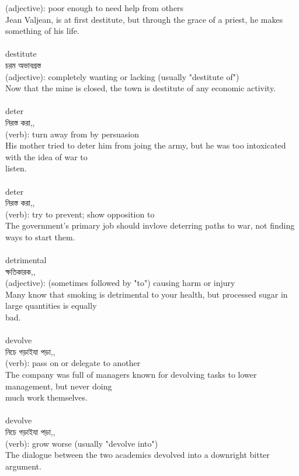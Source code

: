 \documentclass{article}
\begin{document}
{(adjective): poor enough to need help from others\\Jean Valjean, is at first destitute, but through the grace of a priest, he makes something of his life.\\}\\
{destitute}\\
{চরম অভাবগ্রস্ত}\\
{(adjective): completely wanting or lacking (usually "destitute of")\\Now that the mine is closed, the town is destitute of any economic activity.\\}\\
{deter}\\
{নিরস্ত করা,,}\\
{(verb): turn away from by persuasion\\His mother tried to deter him from joing the army, but he was too intoxicated with the idea of war to\\listen.\\}\\
{deter}\\
{নিরস্ত করা,,}\\
{(verb): try to prevent; show opposition to\\The government's primary job should invlove deterring paths to war, not finding ways to start them.\\}\\
{detrimental}\\
{ক্ষতিকারক,,}\\
{(adjective): (sometimes followed by "to") causing harm or injury\\Many know that smoking is detrimental to your health, but processed sugar in large quantities is equally\\bad.\\}\\
{devolve}\\
{নিচে গড়াইযা পড়া,,}\\
{(verb): pass on or delegate to another\\The company was full of managers known for devolving tasks to lower management, but never doing\\much work themselves.\\}\\
{devolve}\\
{নিচে গড়াইযা পড়া,,}\\
{(verb): grow worse (usually "devolve into")\\The dialogue between the two academics devolved into a downright bitter argument.\\}\\
\end{document}
